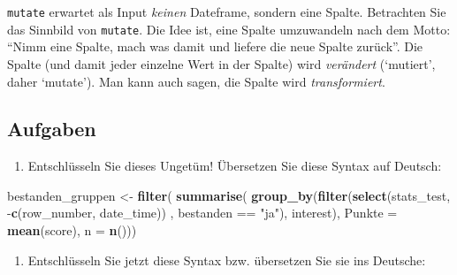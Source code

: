 \documentclass[12pt,ngerman,]{book}
\makeatletter
\newenvironment{Shaded}{\begin{snugshade}}{\end{snugshade}}
\newcommand{\KeywordTok}[1]{\textcolor[rgb]{0.13,0.29,0.53}{\textbf{{#1}}}}
\newcommand{\DataTypeTok}[1]{\textcolor[rgb]{0.13,0.29,0.53}{{#1}}}
\newcommand{\StringTok}[1]{\textcolor[rgb]{0.31,0.60,0.02}{{#1}}}
\newcommand{\CommentTok}[1]{\textcolor[rgb]{0.56,0.35,0.01}{\textit{{#1}}}}
\newcommand{\NormalTok}[1]{{#1}}
\providecommand{\tightlist}{%
  \setlength{\itemsep}{0pt}\setlength{\parskip}{0pt}}
\newenvironment{kframe}{%
\medskip{}
\setlength{\fboxsep}{.8em}
 \def\at@end@of@kframe{}%
 \ifinner\ifhmode%
  \def\at@end@of@kframe{\end{minipage}}%
  \begin{minipage}{\columnwidth}%
 \fi\fi%
 \def\FrameCommand##1{\hskip\@totalleftmargin \hskip-\fboxsep
 \colorbox{shadecolor}{##1}\hskip-\fboxsep
     \hskip-\linewidth \hskip-\@totalleftmargin \hskip\columnwidth}%
 \MakeFramed {\advance\hsize-\width
   \@totalleftmargin\z@ \linewidth\hsize
   \@setminipage}}%
 {\par\unskip\endMakeFramed%
 \at@end@of@kframe}
\renewenvironment{Shaded}{\begin{kframe}}{\end{kframe}}
\theoremstyle{definition}
\theoremstyle{definition}
\theoremstyle{remark}
\let\BeginKnitrBlock\begin \let\EndKnitrBlock\end
\makeatother
\begin{document}
\BeginKnitrBlock{rmdcaution}
\texttt{mutate} erwartet als Input \emph{keinen} Dateframe, sondern eine
Spalte. Betrachten Sie das Sinnbild von \texttt{mutate}. Die Idee ist,
eine Spalte umzuwandeln nach dem Motto: ``Nimm eine Spalte, mach was
damit und liefere die neue Spalte zurück''. Die Spalte (und damit jeder
einzelne Wert in der Spalte) wird \emph{verändert} (`mutiert', daher
`mutate'). Man kann auch sagen, die Spalte wird \emph{transformiert}.
\EndKnitrBlock{rmdcaution}

\subsection{Aufgaben}\label{aufgaben-8}

\begin{enumerate}
\def\labelenumi{\arabic{enumi}.}
\tightlist
\item
  Entschlüsseln Sie dieses Ungetüm! Übersetzen Sie diese Syntax auf
  Deutsch:
\end{enumerate}

\begin{Shaded}
\begin{Highlighting}[]

\NormalTok{bestanden_gruppen <-}
\StringTok{  }\KeywordTok{filter}\NormalTok{(}
    \KeywordTok{summarise}\NormalTok{(}
      \KeywordTok{group_by}\NormalTok{(}\KeywordTok{filter}\NormalTok{(}\KeywordTok{select}\NormalTok{(stats_test, -}\KeywordTok{c}\NormalTok{(row_number, date_time)) , bestanden ==}\StringTok{ "ja"}\NormalTok{), interest), }
      \DataTypeTok{Punkte =} \KeywordTok{mean}\NormalTok{(score), }\DataTypeTok{n =} \KeywordTok{n}\NormalTok{()))}
\end{Highlighting}
\end{Shaded}

\begin{enumerate}
\def\labelenumi{\arabic{enumi}.}
\setcounter{enumi}{1}
\tightlist
\item
  Entschlüsseln Sie jetzt diese Syntax bzw. übersetzen Sie sie ins
  Deutsche:
\end{enumerate}

\begin{Shaded}
\end{Shaded}
\end{document}
